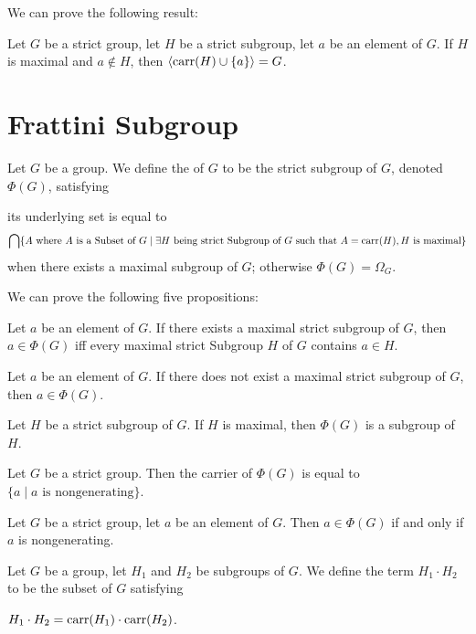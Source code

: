 \documentclass{article}
\begin{document}
We can prove the following result:
\begin{thm}
\item\label{group4:37} Let $G$ be a strict group, let $H$ be a strict
  subgroup, let $a$ be an element of $G$.
  If $H$ is maximal and $a\notin H$, then $\langle\operatorname{carr}(H)\cup\{a\}\rangle=G$.
\end{thm}

\section{Frattini Subgroup}

\begin{definition}
Let $G$ be a group. We define the  of $G$ to
be the strict subgroup of $G$, denoted $\Phi(G)$, satisfying
\begin{defn}
\item its underlying set is equal to
  \[\bigcap\{A\mbox{ where }A\mbox{ is a Subset of }G\mid\exists H\mbox{
    being strict Subgroup of }G\mbox{ such that } A=\operatorname{carr}(H),H\mbox{ is maximal}\}\]
  when there exists a maximal subgroup of $G$; otherwise $\Phi(G)=\Omega_{G}$.
\end{defn}
\end{definition}

We can prove the following five propositions:
\begin{thm}
\item\label{group4:38} Let $a$ be an element of $G$.
  If there exists a maximal strict subgroup of $G$,
  then $a\in\Phi(G)$ iff every maximal strict Subgroup $H$ of $G$
  contains $a\in H$.
\item\label{group4:39} Let $a$ be an element of $G$.
  If there does not exist a maximal strict subgroup
  of $G$, then $a\in\Phi(G)$. 
\item\label{group4:40} Let $H$ be a strict subgroup of $G$. If $H$ is
  maximal, then $\Phi(G)$ is a subgroup of $H$.
\item\label{group4:41} Let $G$ be a strict group.
  Then the carrier of $\Phi(G)$ is equal to $\{a\mid a\mbox{ is nongenerating}\}$.
\item\label{group4:42} Let $G$ be a strict group, let $a$ be an element
  of $G$. Then $a\in\Phi(G)$ if and only if $a$ is nongenerating.
\end{thm}

\begin{definition}
Let $G$ be a group, let $H_{1}$ and $H_{2}$ be subgroups of $G$.
We define the term $H_{1}\cdot H_{2}$ to be the subset of $G$ satisfying
\begin{defn}
\item $H_{1}\cdot H_{2}=\operatorname{carr}(H_{1})\cdot\operatorname{carr}(H_{2})$.
\end{defn}
\end{definition}
\end{document}
